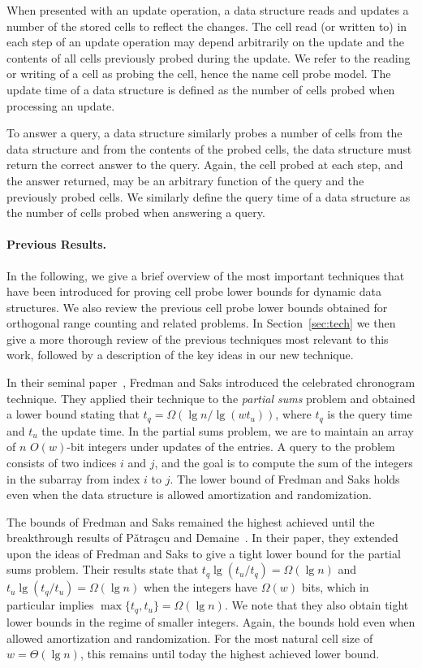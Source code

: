 \documentclass[letterpaper]{article}
\begin{document}
When presented with an update operation, a data structure reads and
updates a number of the stored cells to reflect the changes. The cell
read (or written to) in each step of an update operation may depend
arbitrarily on the update and the contents of all cells previously
probed during the update. We refer to the reading or writing of a cell
as probing the cell, hence the name cell probe model. The update time
of a data structure is defined as the number of cells probed when
processing an update.

To answer a query, a data structure similarly probes a number of cells
from the data structure and from the contents of the probed cells,
the data structure must return the correct answer to the query. Again,
the cell probed at each step, and the answer returned, may be an
arbitrary function of the query and the previously probed cells. We
similarly define the query time of a data structure as the number of
cells probed when answering a query.

\paragraph{Previous Results.}
In the following, we give a brief overview of the most important
techniques that have been introduced for proving cell probe lower
bounds for dynamic data structures. We also review the previous cell
probe lower bounds obtained for orthogonal range counting and related
problems. In Section~\ref{sec:tech} we then give a more thorough
review of the previous techniques most relevant to this work, followed
by a description of the key ideas in our new technique.

In their seminal paper~\cite{Fredman:chrono}, Fredman and Saks
introduced the celebrated chronogram technique. They applied their
technique to the \emph{partial sums} problem and obtained a lower
bound stating that $t_q = \Omega(\lg n/\lg(wt_u))$, where $t_q$ is the
query time and $t_u$ the update time. In the partial sums problem, we
are to maintain an array of $n$ $O(w)$-bit integers under updates
of the entries. A query to the problem consists of two indices $i$ and
$j$, and the goal is to compute the sum of the integers in the
subarray from index $i$ to $j$. The lower bound of Fredman and Saks
holds even when the data structure is allowed amortization and
randomization.

The bounds of Fredman and Saks remained the highest achieved until the
breakthrough results of P{\v a}tra{\c s}cu and
Demaine~\cite{Patrascu:loga}. In their paper, they extended upon the
ideas of Fredman and Saks to give a tight lower bound for the partial
sums problem. Their results state that $t_q\lg(t_u/t_q)=\Omega(\lg n)$
and $t_u \lg(t_q/t_u)=\Omega(\lg n)$ when the integers have
$\Omega(w)$ bits, which in particular implies
$\max\{t_q,t_u\}=\Omega(\lg n)$. We note that they also obtain tight
lower bounds in the regime of smaller integers. Again, the bounds hold
even when allowed amortization and randomization. For the most natural
cell size of $w=\Theta(\lg n)$, this remains until today the highest
achieved lower bound.
\end{document}
